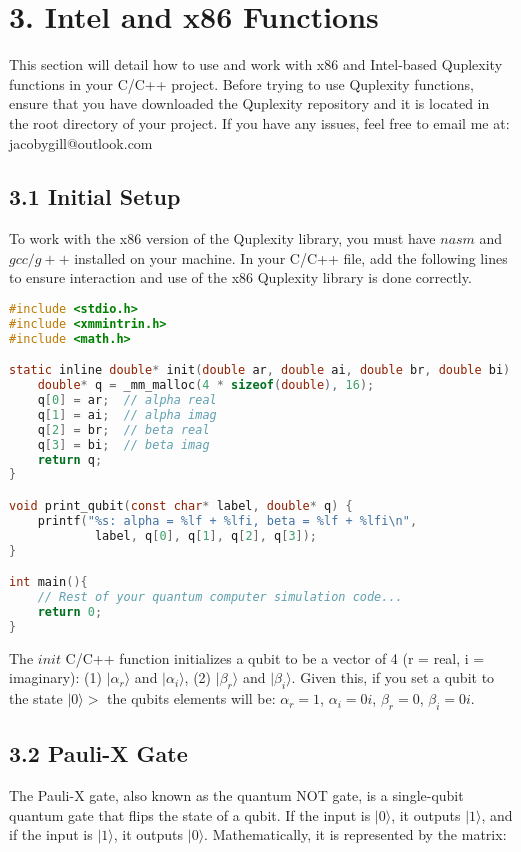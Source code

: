 \documentclass{article}
\begin{document}
\section*{3. Intel and x86 Functions}
This section will detail how to use and work with x86 and Intel-based Quplexity functions in your C/C++ project. Before trying to use Quplexity functions, ensure
that you have downloaded the Quplexity repository and it is located in the root directory of your project. If you have any issues, feel free to email me at: jacobygill@outlook.com

\subsection*{3.1 Initial Setup}
To work with the x86 version of the Quplexity library, you must have $nasm$ and $gcc/g++$ installed on your machine.
In your C/C++ file, add the following lines to ensure interaction and use of the x86 Quplexity library is done correctly.

\begin{lstlisting}[language=C, frame=single]
#include <stdio.h>
#include <xmmintrin.h>
#include <math.h>

static inline double* init(double ar, double ai, double br, double bi) {
    double* q = _mm_malloc(4 * sizeof(double), 16);
    q[0] = ar;  // alpha real
    q[1] = ai;  // alpha imag
    q[2] = br;  // beta real
    q[3] = bi;  // beta imag
    return q;
}

void print_qubit(const char* label, double* q) {
    printf("%s: alpha = %lf + %lfi, beta = %lf + %lfi\n", 
            label, q[0], q[1], q[2], q[3]);
}

int main(){
    // Rest of your quantum computer simulation code...
    return 0;
}
\end{lstlisting}

\noindent The $init$ C/C++ function initializes a qubit to be a vector of 4 (r = real, i = imaginary): (1) $|\alpha_{r}\rangle$ and $|\alpha_{i}\rangle$, (2) $|\beta_{r}\rangle$ and $|\beta_{i}\rangle$.
Given this, if you set a qubit to the state $|0\rangle>$ the qubits elements will be: $\alpha_{r} = 1$, $\alpha_{i} = 0i$, $\beta_{r} = 0$, $\beta_{i} = 0i$.


\subsection*{3.2 Pauli-X Gate}
The Pauli-X gate, also known as the quantum NOT gate, is a single-qubit quantum gate that flips the state of a qubit. If the input is \(|0\rangle\), it outputs \(|1\rangle\), and if the input is \(|1\rangle\), it outputs \(|0\rangle\). Mathematically, it is represented by the matrix:
\end{document}
